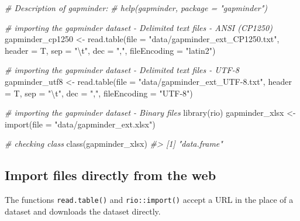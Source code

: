 \documentclass[
]{book}
\newenvironment{Shaded}{\begin{snugshade}}{\end{snugshade}}
\newcommand{\AttributeTok}[1]{\textcolor[rgb]{0.77,0.63,0.00}{#1}}
\newcommand{\CommentTok}[1]{\textcolor[rgb]{0.56,0.35,0.01}{\textit{#1}}}
\newcommand{\FunctionTok}[1]{\textcolor[rgb]{0.00,0.00,0.00}{#1}}
\newcommand{\NormalTok}[1]{#1}
\newcommand{\OtherTok}[1]{\textcolor[rgb]{0.56,0.35,0.01}{#1}}
\newcommand{\SpecialCharTok}[1]{\textcolor[rgb]{0.00,0.00,0.00}{#1}}
\newcommand{\StringTok}[1]{\textcolor[rgb]{0.31,0.60,0.02}{#1}}
\begin{document}
\begin{Shaded}
\begin{Highlighting}[]
\CommentTok{\# Description of gapminder:}
\CommentTok{\# help(gapminder, package = "gapminder")}

\CommentTok{\# importing the gapminder dataset {-} Delimited text files {-} ANSI (CP1250)}
\NormalTok{gapminder\_cp1250 }\OtherTok{\textless{}{-}} \FunctionTok{read.table}\NormalTok{(}\AttributeTok{file =} \StringTok{"data/gapminder\_ext\_CP1250.txt"}\NormalTok{, }\AttributeTok{header =}\NormalTok{ T, }\AttributeTok{sep =} \StringTok{"}\SpecialCharTok{\textbackslash{}t}\StringTok{"}\NormalTok{, }\AttributeTok{dec =} \StringTok{","}\NormalTok{, }\AttributeTok{fileEncoding =} \StringTok{"latin2"}\NormalTok{)}

\CommentTok{\# importing the gapminder dataset {-} Delimited text files {-} UTF{-}8}
\NormalTok{gapminder\_utf8 }\OtherTok{\textless{}{-}} \FunctionTok{read.table}\NormalTok{(}\AttributeTok{file =} \StringTok{"data/gapminder\_ext\_UTF{-}8.txt"}\NormalTok{, }\AttributeTok{header =}\NormalTok{ T, }\AttributeTok{sep =} \StringTok{"}\SpecialCharTok{\textbackslash{}t}\StringTok{"}\NormalTok{, }\AttributeTok{dec =} \StringTok{","}\NormalTok{, }\AttributeTok{fileEncoding =} \StringTok{"UTF{-}8"}\NormalTok{)}

\CommentTok{\# importing the gapminder dataset {-} Binary files}
\FunctionTok{library}\NormalTok{(rio)}
\NormalTok{gapminder\_xlsx }\OtherTok{\textless{}{-}} \FunctionTok{import}\NormalTok{(}\AttributeTok{file =} \StringTok{"data/gapminder\_ext.xlsx"}\NormalTok{)}

\CommentTok{\# checking class}
\FunctionTok{class}\NormalTok{(gapminder\_xlsx)}
\CommentTok{\#\textgreater{} [1] "data.frame"}
\end{Highlighting}
\end{Shaded}

\hypertarget{import-files-directly-from-the-web}{%
\subsection{Import files directly from the web}\label{import-files-directly-from-the-web}}

The functions \texttt{read.table()} and \texttt{rio::import()} accept a URL in the place of a dataset and downloads the dataset directly.
\end{document}
